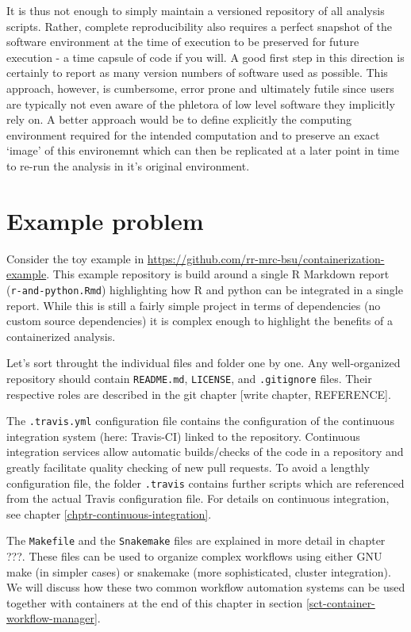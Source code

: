 \documentclass[]{book}
\begin{document}
It is thus not enough to simply maintain a versioned repository of all
analysis scripts. Rather, complete reproducibility also requires a
perfect snapshot of the software environment at the time of execution to
be preserved for future execution - a time capsule of code if you will.
A good first step in this direction is certainly to report as many
version numbers of software used as possible. This approach, however, is
cumbersome, error prone and ultimately futile since users are typically
not even aware of the phletora of low level software they implicitly
rely on. A better approach would be to define explicitly the computing
environment required for the intended computation and to preserve an
exact `image' of this environemnt which can then be replicated at a
later point in time to re-run the analysis in it's original environment.

\section{Example problem}\label{example-problem}

Consider the toy example in
\url{https://github.com/rr-mrc-bsu/containerization-example}. This
example repository is build around a single R Markdown report
(\texttt{r-and-python.Rmd}) highlighting how R and python can be
integrated in a single report. While this is still a fairly simple
project in terms of dependencies (no custom source dependencies) it is
complex enough to highlight the benefits of a containerized analysis.

Let's sort throught the individual files and folder one by one. Any
well-organized repository should contain \texttt{README.md},
\texttt{LICENSE}, and \texttt{.gitignore} files. Their respective roles
are described in the git chapter {[}write chapter, REFERENCE{]}.

The \texttt{.travis.yml} configuration file contains the configuration
of the continuous integration system (here: Travis-CI) linked to the
repository. Continuous integration services allow automatic
builds/checks of the code in a repository and greatly facilitate quality
checking of new pull requests. To avoid a lengthly configuration file,
the folder \texttt{.travis} contains further scripts which are
referenced from the actual Travis configuration file. For details on
continuous integration, see chapter \ref{chptr-continuous-integration}.

The \texttt{Makefile} and the \texttt{Snakemake} files are explained in
more detail in chapter ???. These files can be used to organize complex
workflows using either GNU make (in simpler cases) or snakemake (more
sophisticated, cluster integration). We will discuss how these two
common workflow automation systems can be used together with containers
at the end of this chapter in section
\ref{sct-container-workflow-manager}.
\end{document}
